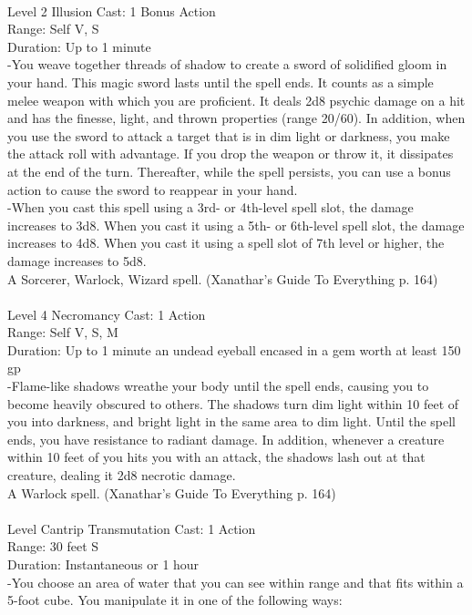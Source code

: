 \documentclass[10pt,twocolumn]{report}
\begin{document}
 \\
Level 2 \quad Illusion \quad Cast: 1 Bonus Action\\
Range: Self \quad V, S\\
Duration: Up to 1 minute \quad \\
-You weave together threads of shadow to create a sword of solidified gloom in your hand. This magic sword lasts until the spell ends. It counts as a simple melee weapon with which you are proficient. It deals 2d8 psychic damage on a hit and has the finesse, light, and thrown properties (range 20/60). In addition, when you use the sword to attack a target that is in dim light or darkness, you make the attack roll with advantage.
If you drop the weapon or throw it, it dissipates at the end of the turn. Thereafter, while the spell persists, you can use a bonus action to cause the sword to reappear in your hand.\\
-When you cast this spell using a 3rd- or 4th-level spell slot, the damage increases to 3d8. When you cast it using a 5th- or 6th-level spell slot, the damage increases to 4d8. When you cast it using a spell slot of 7th level or higher, the damage increases to 5d8.\\
A Sorcerer, Warlock, Wizard spell. (Xanathar's Guide To Everything p. 164) \\


 \\
Level 4 \quad Necromancy \quad Cast: 1 Action\\
Range: Self \quad V, S, M\\
Duration: Up to 1 minute \quad an undead eyeball encased in a gem worth at least 150 gp\\
-Flame-like shadows wreathe your body until the spell ends, causing you to become heavily obscured to others. The shadows turn dim light within 10 feet of you into darkness, and bright light in the same area to dim light.
Until the spell ends, you have resistance to radiant damage. In addition, whenever a creature within 10 feet of you hits you with an attack, the shadows lash out at that creature, dealing it 2d8 necrotic damage.\\
A Warlock spell. (Xanathar's Guide To Everything p. 164) \\


 \\
Level Cantrip \quad Transmutation \quad Cast: 1 Action\\
Range: 30 feet \quad S\\
Duration: Instantaneous or 1 hour \quad \\
-You choose an area of water that you can see within range and that fits within a 5-foot cube. 
You manipulate it in one of the following ways:
\end{document}
